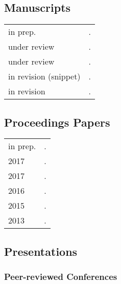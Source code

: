 \documentclass[12pt,letterpaper,twoside]{article}
\makeatletter
\newenvironment{cvsection}{%
  \setlength{\extrarowheight}{0.70ex}
  \begin{longtable}[l]{@{} L R @{}}
}{%
  \end{longtable}
}
\makeatother
\begin{document}
\subsection*{Manuscripts}

\begin{cvsection}
  in prep. & .\\
  under review & .\\
  under review & .\\
  in revision (snippet) & .\\
  in revision & .\\
\end{cvsection}

\subsection*{Proceedings Papers}

\begin{cvsection}
  in prep. & .\\
  2017 & .\\
  2017 & .\\
  2016 & .\\
  2015 & .\\
  2013 & .\\
\end{cvsection}

\clearpage

\subsection*{Presentations}

\subsubsection*{Peer-reviewed Conferences}
\end{document}
